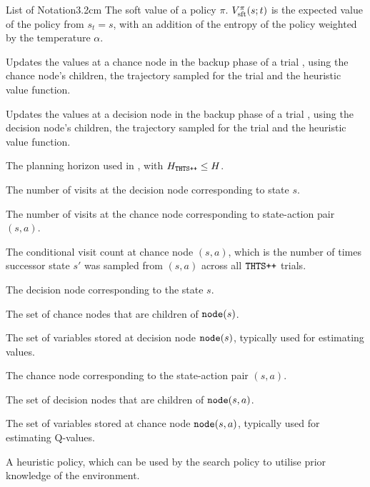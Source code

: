 \begin{mclistof}{List of Notation}{3.2cm}
        The soft value of a policy $\pi$. $V_{{\textnormal{sft}}}^{\pi}(s;t)$ is the expected value of the policy from $s_t=s$, with an addition of the entropy of the policy weighted by the temperature $\alpha$. %
        \\
    \item[$\backupq$] 
        Updates the values at a chance node in the backup phase of a trial \thtspp, using the chance node's children, the trajectory sampled for the trial and the heuristic value function.
    \item[$\backupv$]
        Updates the values at a decision node in the backup phase of a trial \thtspp, using the decision node's children, the trajectory sampled for the trial and the heuristic value function.
    \item[$H_{\thtspp}$]
        The planning horizon used in \thtspp, with $H_{{\textnormal{\texttt{THTS++}}}}\leq H$.
    \item[$N(s)$]
        The number of visits at the decision node corresponding to state $s$.
    \item[$N(s,a)$]
        The number of visits at the chance node corresponding to state-action pair $(s,a)$.
    \item[$N(s'|s,a)$]
        The \textnormal{conditional visit count} at chance node $(s,a)$, which is the number of times successor state $s'$ was sampled from $(s,a)$ across all ${\textnormal{\texttt{THTS++}}}$ trials.
    \item[$\node(s)$] 
        The decision node corresponding to the state $s$.
    \item[$\node(s)\dotchildren$]
        The set of chance nodes that are children of $\node(s)$.
    \item[$\dnodedata{s}$]
        The set of variables stored at decision node $\node(s)$, typically used for estimating values.
    \item[$\node(s,a)$] 
        The chance node corresponding to the state-action pair $(s,a)$.
    \item[$\node(s,a)\dotchildren$]
        \hspace{0.25cm} The set of decision nodes that are children of $\node(s,a)$.
    \item[$\cnodedata{s,a}$] 
        The set of variables stored at chance node $\node(s,a)$, typically used for estimating Q-values.
    \item[$\piinit$]
        A heuristic policy, which can be used by the search policy to utilise prior knowledge of the environment.

\end{mclistof}
